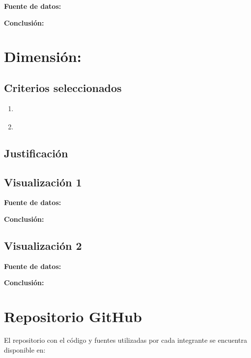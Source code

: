 \documentclass[12pt]{article}
\begin{document}
\textbf{Fuente de datos:} %

\textbf{Conclusión:} \\


\section*{Dimensión: %
}

\subsection*{Criterios seleccionados}
\begin{enumerate}
    \item \textbf{%
    }
    \item \textbf{%
    }
\end{enumerate}

\subsection*{Justificación}

\subsection*{Visualización 1}

\textbf{Fuente de datos:} %

\textbf{Conclusión:} \\

\subsection*{Visualización 2}

\textbf{Fuente de datos:} %

\textbf{Conclusión:} \\


\section*{Repositorio GitHub}
El repositorio con el código y fuentes utilizadas por cada integrante se encuentra disponible en: \\
\end{document}
